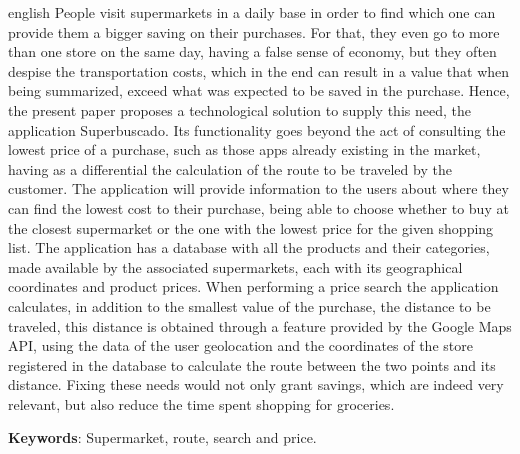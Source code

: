 \begin{resumo}[Abstract]
\vspace{1cm}
\begin{otherlanguage*}{english}
People visit supermarkets in a daily base in order to find which one can provide them a bigger saving on their purchases. For that, they even go to more than one store on the same day, having a false sense of economy, but they often despise the transportation costs, which in the end can result in a value that when being summarized, exceed what was expected to be saved in the purchase. Hence, the present paper proposes a technological solution to supply this need, the application Superbuscado. Its functionality goes beyond the act of consulting the lowest price of a purchase, such as those apps already existing in the market, having as a differential the calculation of the route to be traveled by the customer.
The application will provide information to the users about where they can find the lowest cost to their purchase, being able to choose whether to buy at the closest supermarket or the one with the lowest price for the given shopping list.
The application has a database with all the products and their categories, made available by the associated supermarkets, each with its geographical coordinates and product prices. When performing a price search the application calculates, in addition to the smallest value of the purchase, the distance to be traveled, this distance is obtained through a feature provided by the Google Maps API, using the data of the user geolocation and the coordinates of the store registered in the database to calculate the route between the two points and its distance.
Fixing these needs would not only grant savings, which are indeed very relevant, but also reduce the time spent shopping for groceries.

\textbf{Keywords}: Supermarket, route, search and price.
\end{otherlanguage*}
\end{resumo}